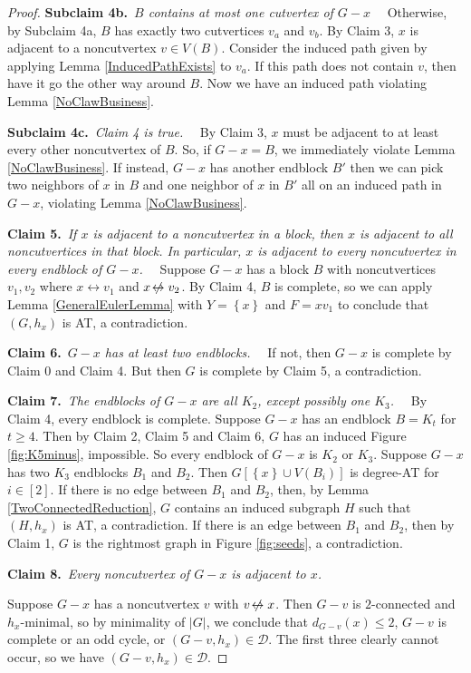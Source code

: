 \documentclass[12pt]{article}
\theoremstyle{plain}
\theoremstyle{definition}
\theoremstyle{remark}
\newcommand{\fancy}[1]{\mathcal{#1}}
\newcommand{\D}{\fancy{D}}
\newcommand{\set}[1]{\left\{ #1 \right\}}
\newcommand{\card}[1]{\left|#1\right|}
\newcommand{\irange}[1]{\left[#1\right]}
\def\adj{\leftrightarrow}
\def\nonadj{\not\!\leftrightarrow}
\def\D{\fancy{D}}
\newcommand{\claim}[2]{{\bf Claim #1.}~{\it #2}~~}
\newcommand{\subclaim}[2]{{\bf Subclaim #1.}~{\it #2}~~}
\def\adj{\leftrightarrow}
\begin{document}
\begin{proof}
	  \subclaim{4b}{$B$ contains at most one cutvertex of $G-x$}
	  Otherwise, by Subclaim 4a, $B$ has exactly two cutvertices $v_a$ and $v_b$.  By Claim 3, $x$ is adjacent to a noncutvertex $v \in V(B)$.  Consider the induced path given by applying Lemma \ref{InducedPathExists} to $v_a$.  If this path does not contain $v$, then have it go the other way around $B$.  Now we have an induced path violating Lemma \ref{NoClawBusiness}. 
	
	  \subclaim{4c}{Claim 4 is true.}
	  By Claim 3, $x$ must be adjacent to at least every other noncutvertex of $B$. So, if $G-x = B$, we immediately violate Lemma \ref{NoClawBusiness}.  If instead, $G-x$ has another endblock $B'$ then we can pick two neighbors of $x$ in $B$ and one neighbor of $x$ in $B'$ all on an induced path in $G-x$, violating Lemma \ref{NoClawBusiness}.
	 
	 \claim{5}{If $x$ is adjacent to a noncutvertex in a block, then $x$ is adjacent to all noncutvertices in that block. In particular, $x$ is adjacent to every noncutvertex in every endblock of $G-x$.}
	  Suppose $G-x$ has a block $B$ with noncutvertices $v_1,v_2$ where $x \adj v_1$ and $x \nonadj v_2$.  By Claim 4, $B$ is complete, so we can apply Lemma \ref{GeneralEulerLemma} with $Y = \set{x}$ and $F = xv_1$ to conclude that $(G,h_x)$ is AT, a contradiction.  
	 	 
	 \claim{6}{$G-x$ has at least two endblocks.}
   	  If not, then $G-x$ is complete by Claim 0 and Claim 4.  But then $G$ is complete by Claim 5, a contradiction.
	 
	 \claim{7}{The endblocks of $G-x$ are all $K_2$, except possibly one $K_3$.}
	 By Claim 4, every endblock is complete.  Suppose $G-x$ has an endblock $B = K_t$ for $t \ge 4$.  Then by Claim 2, Claim 5 and Claim 6, $G$ has an induced Figure \ref{fig:K5minus}, impossible.  So every endblock of $G-x$ is $K_2$ or $K_3$.  Suppose $G-x$ has two $K_3$ endblocks $B_1$ and $B_2$.  Then $G[\set{x} \cup V(B_i)]$ is degree-AT for $i \in \irange{2}$.  If there is no edge between $B_1$ and $B_2$, then, by Lemma \ref{TwoConnectedReduction}, $G$ contains an induced subgraph $H$ such that $(H,h_x)$ is AT, a contradiction.  If there is an edge between $B_1$ and $B_2$, then by Claim 1, $G$ is the rightmost graph in Figure \ref{fig:seeds}, a contradiction.

	 \claim{8}{Every noncutvertex of $G-x$ is adjacent to $x$.}
	 
	 Suppose $G-x$ has a noncutvertex $v$ with $v \nonadj x$. Then $G-v$ is $2$-connected and $h_x$-minimal, so by minimality of $\card{G}$, we conclude that $d_{G-v}(x) \le 2$, $G-v$ is complete or an odd cycle, or $(G-v,h_x) \in \D$.  The first three clearly cannot occur, so we have $(G-v,h_x) \in \D$.  
	 

\end{proof}
\end{document}
